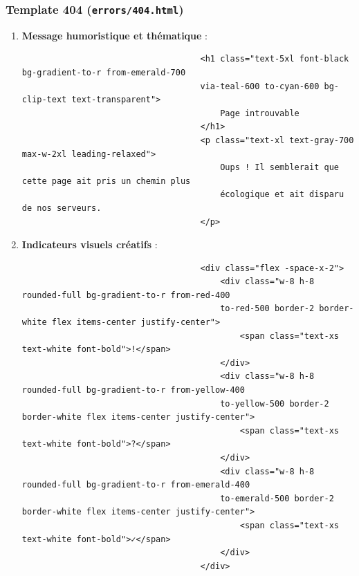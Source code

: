 \documentclass[a4paper,11pt]{article}
\begin{document}
                \subsubsection{Template 404 (\texttt{errors/404.html})}
                    \begin{enumerate}
                        \item \textbf{Message humoristique et thématique} :
                            \begin{tcolorbox}[colback=lightgray!5, colframe=gray!80, left=-70mm, right=5mm, top=2mm, bottom=0mm, boxrule=0.1mm]
                                \begin{verbatim}
                                    <h1 class="text-5xl font-black bg-gradient-to-r from-emerald-700 
                                    via-teal-600 to-cyan-600 bg-clip-text text-transparent">
                                        Page introuvable
                                    </h1>
                                    <p class="text-xl text-gray-700 max-w-2xl leading-relaxed">
                                        Oups ! Il semblerait que cette page ait pris un chemin plus 
                                        écologique et ait disparu de nos serveurs.
                                    </p>
                                \end{verbatim}
                            \end{tcolorbox}

                        \item \textbf{Indicateurs visuels créatifs} :
                            \begin{tcolorbox}[colback=lightgray!5, colframe=gray!80, left=-70mm, right=5mm, top=2mm, bottom=0mm, boxrule=0.1mm]
                                \begin{verbatim}
                                    <div class="flex -space-x-2">
                                        <div class="w-8 h-8 rounded-full bg-gradient-to-r from-red-400 
                                        to-red-500 border-2 border-white flex items-center justify-center">
                                            <span class="text-xs text-white font-bold">!</span>
                                        </div>
                                        <div class="w-8 h-8 rounded-full bg-gradient-to-r from-yellow-400 
                                        to-yellow-500 border-2 border-white flex items-center justify-center">
                                            <span class="text-xs text-white font-bold">?</span>
                                        </div>
                                        <div class="w-8 h-8 rounded-full bg-gradient-to-r from-emerald-400 
                                        to-emerald-500 border-2 border-white flex items-center justify-center">
                                            <span class="text-xs text-white font-bold">✓</span>
                                        </div>
                                    </div>
                                \end{verbatim}
                            \end{tcolorbox}


\end{enumerate}
\end{document}
